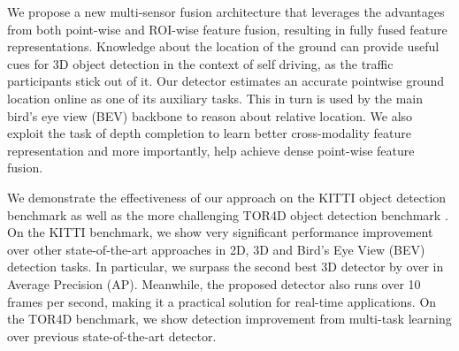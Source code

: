 \documentclass[10pt,twocolumn,letterpaper]{article}
\begin{document}
We propose a new multi-sensor fusion architecture that leverages the advantages from both point-wise and ROI-wise feature fusion, resulting in  fully fused feature representations. 
Knowledge about the location of the ground can provide useful cues for 3D object detection in the context of self driving, as the traffic participants stick out of it. Our detector estimates an accurate pointwise  ground location online as one of its auxiliary tasks. This in turn is used by the main bird's eye view (BEV) backbone to  reason about relative location. 
We also exploit the task of depth completion to learn better cross-modality feature representation and more importantly, help achieve dense point-wise feature fusion.

We demonstrate the effectiveness of our approach on the KITTI object detection benchmark \cite{kitti} as well as the more challenging TOR4D object detection benchmark \cite{pixor}. On the KITTI benchmark, we show very significant performance improvement over other state-of-the-art approaches in 2D, 3D and Bird's Eye View (BEV) detection tasks. 
In particular, we surpass the second best 3D detector by over  in Average Precision (AP).
Meanwhile, the proposed detector also runs over 10 frames per second, making it a practical solution for real-time applications. On the TOR4D benchmark, we show detection improvement from multi-task learning over previous state-of-the-art detector.
\end{document}
